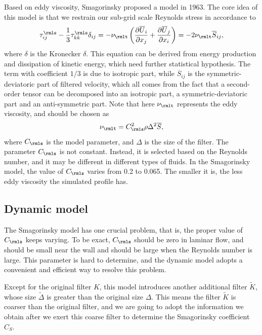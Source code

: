 \documentclass[english, nochinese]{pkupaper}
\begin{document}
Based on eddy viscosity, Smagorinsky proposed a model in 1963. The core idea of this model is that we restrain our sub-grid scale Reynolds stress in accordance to
\begin{equation}\label{Eq:SMAG}
\tau^{\rmls}_{ij} - \frac{1}{3}\tau^{\rmls}_{kk}\delta_{ij} = -\nu_{\rmlt} \left(\frac{\partial\overline{U}_i}{\partial x_j} + \frac{\partial\overline{U}_j}{\partial x_i}\right) = -2\nu_{\rmlt}\overline{S}_{ij},
\end{equation}
where $\delta$ is the Kronecker $\delta$. This equation can be derived from energy production and dissipation of kinetic energy, which need further statistical hypothesis. The term with coefficient $ 1 / 3 $ is due to isotropic part, while $ \overline{S}_{ i j } $ is the symmetric-deviatoric part of filtered velocity, which all comes from the fact that a second-order tensor can be decomposed into an isotropic part, a symmetric-deviatoric part and an anti-symmetric part. Note that here $\nu_{\rmlt}$ represents the eddy viscosity, and should be chosen as
\begin{equation}\label{Eq:MuT}
\nu_{\rmlt} = C_{\rmls}^2 \rho \Delta^2 \overline{S},
\end{equation}
where $C_{\rmls}$ is the model parameter, and $\Delta$ is the size of the filter. 
The parameter $C_{\rmls}$ is not constant. Instead, it is selected based on the Reynolds number, and it may be different in different types of fluids. In the Smagorinsky model, the value of $C_{\rmls}$ varies from 0.2 to 0.065. The smaller it is, the less eddy viscosity the simulated profile has.

\subsection{Dynamic model}

The Smagorinsky model has one crucial problem, that is, the proper value of $C_{\rmls}$ keeps varying. To be exact, $C_{\rmls}$ should be zero in laminar flow, and should be small near the wall and should be large when the Reynolds number is large. This parameter is hard to determine, and the dynamic model adopts a convenient and efficient way to resolve this problem.

Except for the original filter $K$, this model introduces another additional filter $\widetilde{K}$, whose size $\widetilde{\Delta}$ is greater than the original size $\Delta$. This means the filter $\widetilde{K}$ is coarser than the original filter, and we are going to adopt the information we obtain after we exert this coarse filter to determine the Smagorinsky coefficient $C_S$.
\end{document}
